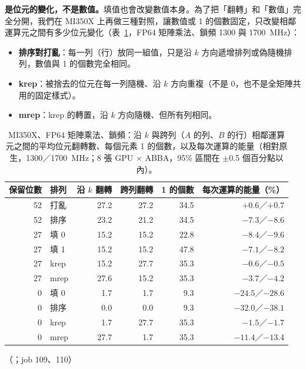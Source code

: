 \textbf{是位元的變化，不是數值。}填值也會改變數值本身。為了把「翻轉」和「數值」完全分開，我們在 MI350X 上再做三種對照，讓數值或 1 的個數固定，只改變相鄰運算元之間有多少位元變化（表~\ref{tab:mi-flips}，FP64 矩陣乘法、鎖頻 1300 與 1700~MHz）：
\begin{itemize}
  \item \textbf{排序對打亂}：每一列（行）放同一組值，只是沿 $k$ 方向遞增排列或偽隨機排列，數值與 1 的個數完全相同。
  \item \textbf{krep}：被捨去的位元在每一列隨機、沿 $k$ 方向重複（不是 0，也不是全矩陣共用的固定樣式）。
  \item \textbf{mrep}：krep 的轉置，沿 $k$ 方向隨機、但所有列相同。
\end{itemize}

\begin{table}[tbp]
\centering
\caption[MI350X 上的位元變化對照]{MI350X、FP64 矩陣乘法、鎖頻：沿 $k$ 與跨列（$A$ 的列、$B$ 的行）相鄰運算元之間的平均位元翻轉數、每個元素 1 的個數，以及每次運算的能量（相對原生，1300／1700~MHz；8 張 GPU × ABBA，95\% 區間在 $\pm$0.5 個百分點以內）。}\label{tab:mi-flips}
\small
\begin{tabular}{@{}rlrrrr@{}}
\toprule
保留位數 & 排列 & 沿 $k$ 翻轉 & 跨列翻轉 & 1 的個數 & 每次運算的能量（\%） \\
\midrule
52 & 打亂 & 27.2 & 27.2 & 34.5 & $+0.6$／$+0.7$ \\
52 & 排序 & 23.2 & 21.2 & 34.5 & $-7.3$／$-8.6$ \\
27 & 填 0 & 15.2 & 15.2 & 22.8 & $-8.4$／$-9.6$ \\
27 & 填 1 & 15.2 & 15.2 & 47.8 & $-7.1$／$-8.2$ \\
27 & krep & 15.2 & 27.7 & 35.3 & $-0.6$／$-0.5$ \\
27 & mrep & 27.6 & 15.2 & 35.3 & $-3.7$／$-4.2$ \\
0 & 填 0 & 1.7 & 1.7 & 9.3 & $-24.5$／$-28.6$ \\
0 & 排序 & 0.0 & 0.0 & 9.3 & $-32.0$／$-38.1$ \\
0 & krep & 1.7 & 27.7 & 35.3 & $-1.5$／$-1.7$ \\
0 & mrep & 27.7 & 1.7 & 35.3 & $-11.4$／$-13.4$ \\
\bottomrule
\end{tabular}
\begin{figsource}（；job 109、110）\end{figsource}
\end{table}

